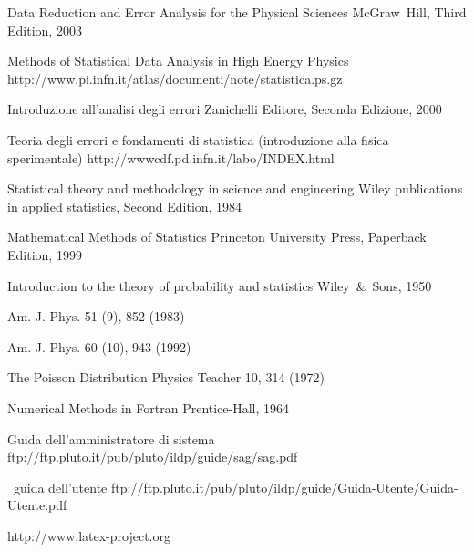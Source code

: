 \begin{thebibliography}{100}


{Data Reduction and Error Analysis for the Physical Sciences}
{McGraw~Hill, Third Edition, 2003}

{Methods of Statistical Data Analysis in High Energy Physics}
{http://www.pi.infn.it/atlas/documenti/note/statistica.ps.gz}

{Introduzione all'analisi degli errori}
{Zanichelli Editore, Seconda Edizione, 2000}

{Teoria degli errori e fondamenti di statistica (introduzione alla fisica
sperimentale)}
{http://wwwcdf.pd.infn.it/labo/INDEX.html}

{Statistical theory and methodology in science and engineering}
{Wiley publications in applied statistics, Second Edition, 1984}

{Mathematical Methods of Statistics}
{Princeton University Press, Paperback Edition, 1999}

{Introduction to the theory of probability and statistics}
{Wiley~\&~Sons, 1950}

{Am. J. Phys. 51 (9), 852 (1983)}

{Am. J. Phys. 60 (10), 943 (1992)}

{The Poisson Distribution}
{Physics Teacher 10, 314 (1972)}

{Numerical Methods in Fortran}
{Prentice-Hall, 1964}

{Guida dell'amministratore di sistema \linux}
{ftp://ftp.pluto.it/pub/pluto/ildp/guide/sag/sag.pdf}

{\linux\ guida dell'utente}
{ftp://ftp.pluto.it/pub/pluto/ildp/guide/Guida-Utente/Guida-Utente.pdf}

{http://www.latex-project.org}


\end{thebibliography}
